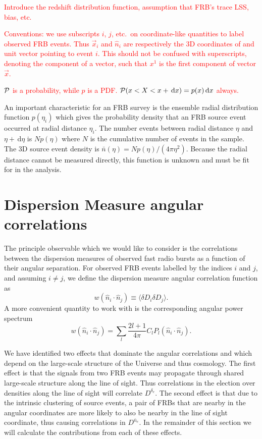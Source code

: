 \documentclass[onecolumn,prd,noshowpacs,nofootinbib,amsmath,amssymb]{revtex4}
\newcommand{\Dne}{D^{\bar{n}_e}}
\newcommand{\Dde}{D^{\delta_e}}
\newcommand{\del}{\delta\!}
\newcommand{\calP}{{\cal P}}
\newcommand{\ud}{\,\mathrm{d}}
\newcommand{\red}{\textcolor{red}}
\begin{document}
\red{Introduce the redshift distribution function, assumption that FRB's trace
LSS, bias, etc.}

\red{Conventions: we use subscripts $i$, $j$, etc.~on coordinate-like
    quantities to label observed FRB events. Thus $\vec x_i$ and $\hat{n}_i$
    are respectively the 3D coordinates of and unit vector pointing to event $i$.
    This should not be confused with superscripts, denoting the
component of a vector, such that $x^1$ is the first component of vector $\vec
x$.  }

\red{$\calP$ is a probability, while $p$ is a PDF. $\calP(x < X < x + \ud x) =
p(x) \ud x$ always.}

An important characteristic for an FRB survey is the ensemble radial distribution
function $p(\eta_i)$ which gives the probability density that an FRB source event 
occurred at radial distance $\eta_i$. The number events between radial distance
$\eta$ and $\eta + \ud \eta$ is
$N p(\eta)$ where $N$ is the cumulative number of events in the sample. The 3D source
event density is $\bar{n}(\eta) = N p(\eta) / (4 \pi \eta^2)$. Because the
radial distance cannot be measured directly, this function is unknown and must
be fit for in the analysis.


\section{Dispersion Measure angular correlations}



The principle observable which we would like to consider is the correlations
between the dispersion measures of observed fast radio bursts as a function of
their angular separation.  For observed FRB events labelled by the indices $i$
and $j$, and assuming $i \neq j$, we define the dispersion measure angular
correlation function as
\begin{equation}
    w(\hat{n}_i\cdot\hat{n}_j) \equiv \langle \del D_i \del D_j \rangle.
\end{equation}
A more convenient quantity to work with is the corresponding angular
power spectrum
\begin{equation}
w(\hat{n}_i \cdot\hat{n}_j) = \sum_l \frac{2l+1}{4 \pi} C_l
P_l(\hat{n}_i\cdot\hat{n}_j).
\end{equation}

We have identified two effects that dominate the angular
correlations and which depend on the large-scale structure of the Universe and
thus cosmology.  The first effect is that the signals from two FRB events may
propagate through shared large-scale structure along the line of sight.
Thus correlations
in the election over densities along the line of sight will correlate
$\Dde$.  The second effect is that due to the intrinsic clustering of source
events, a pair of FRBs that are nearby in the angular coordinates are more
likely to also be nearby in the line of sight coordinate, thus causing
correlations in $\Dne$.  In the remainder of this section we will calculate the
contributions from each of these effects.
\end{document}
